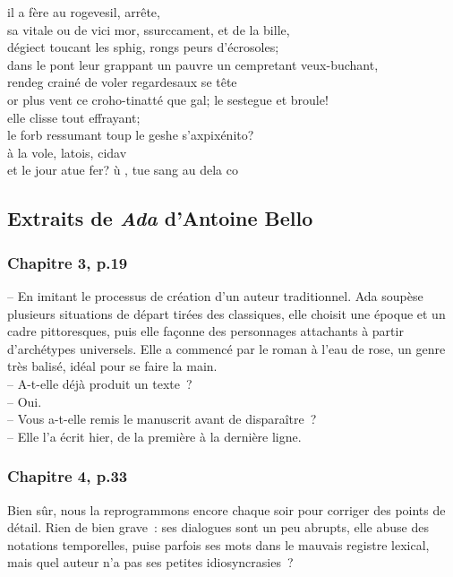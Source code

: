 \documentclass{article}
\begin{document}
				il a fère au rogevesil, arrête,\\
				sa vitale ou de vici mor, ssurccament, et de la bille,\\
				dégiect toucant les sphig, rongs peurs d'écrosoles;\\
				dans le pont leur grappant un pauvre un cempretant veux-buchant,\\
				rendeg crainé de voler regardesaux se tête\\
				or plus vent ce croho-tinatté que gal; le sestegue et broule!\\
				
				elle clisse tout effrayant;\\
				le forb ressumant toup le geshe s'axpixénito?\\
				à la vole, latois, cidav\\
				et le jour atue fer? ù , tue sang au dela co\\
			\newpage
		
		\subsection{Extraits de \textit{Ada} d'Antoine Bello}
			\subsubsection{Chapitre 3, p.19}\label{ada_elaboration}
				-- En imitant le processus de création d'un auteur traditionnel. Ada soupèse plusieurs situations de départ tirées des classiques, elle choisit une époque et un cadre pittoresques, puis elle façonne des personnages attachants à partir d'archétypes universels. Elle a commencé par le roman à l'eau de rose, un genre très balisé, idéal pour se faire la main.\\
				-- A-t-elle déjà produit un texte~?\\
				-- Oui.\\
				-- Vous a-t-elle remis le manuscrit avant de disparaître~?\\
				-- Elle l'a écrit hier, de la première à la dernière ligne.
			\subsubsection{Chapitre 4, p.33}\label{ada_bug}
				Bien sûr, nous la reprogrammons encore chaque soir pour corriger des points de détail. Rien de bien grave~: ses dialogues sont un peu abrupts, elle abuse des notations temporelles, puise parfois ses mots dans le mauvais registre lexical, mais quel auteur n'a pas ses petites idiosyncrasies~?
\end{document}

